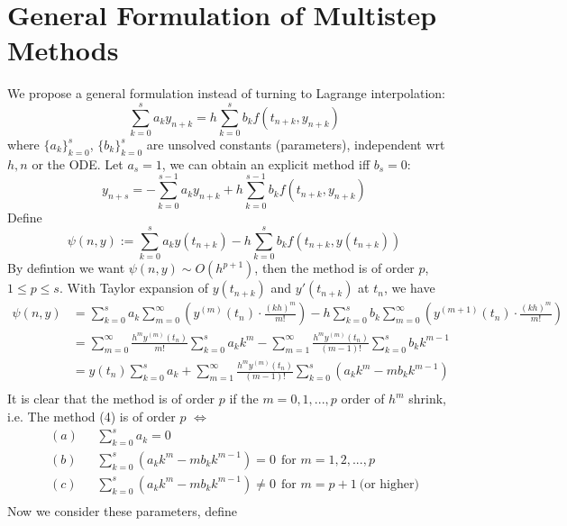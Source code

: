 \documentclass[a4paper, 11pt]{article}
\begin{document}
\section{General Formulation of Multistep Methods}
We propose a general formulation instead of turning to Lagrange interpolation:
\begin{equation}
	\sum_{k=0}^s a_k y_{n+k} = h\sum_{k=0}^s b_k f(t_{n+k}, y_{n+k})
\end{equation}
where $\{a_k\}_{k=0}^s$, $\{b_k\}_{k=0}^s$ are unsolved constants (parameters), independent wrt $h, n$ or the ODE. Let $a_s=1$, we can obtain an explicit method iff $b_s=0$:
$$
y_{n+s} = -\sum_{k=0}^{s-1} a_k y_{n+k} + h\sum_{k=0}^{s-1} b_k f(t_{n+k}, y_{n+k})
$$
Define
\begin{equation}
	\psi(n,y):= \sum_{k=0}^s a_k y(t_{n+k}) - h\sum_{k=0}^s b_k f(t_{n+k}, y(t_{n+k}))
\end{equation}
By defintion we want $\psi(n,y)\sim O(h^{p+1})$, then the method is of order $p$, $1\leq p\leq s$. With Taylor expansion of $y(t_{n+k})$ and $y'(t_{n+k})$ at $t_n$, we have
\begin{equation}
	\begin{split}
		\psi(n,y) &= \sum_{k=0}^s a_k \sum_{m=0}^{\infty}\left(y^{(m)}(t_{n})\cdot\frac{(kh)^m}{m!}\right) - h\sum_{k=0}^s b_k \sum_{m=0}^{\infty}\left(y^{(m+1)}(t_{n})\cdot\frac{(kh)^m}{m!}\right) \\
		&= \sum_{m=0}^{\infty}\frac{h^m y^{(m)}(t_n)}{m!} \sum_{k=0}^s a_k k^{m} - \sum_{m=1}^{\infty}\frac{h^m y^{(m)}(t_n)}{(m-1)!} \sum_{k=0}^s b_k k^{m-1}\\
		&= y(t_n)\sum_{k=0}^{s}a_k + \sum_{m=1}^{\infty}\frac{h^m y^{(m)}(t_n)}{(m-1)!}\sum_{k=0}^s (a_k k^m - mb_k k^{m-1})\\
	\end{split}
\end{equation}
It is clear that the method is of order $p$ if the $m=0, 1, ..., p$ order of $h^m$ shrink, i.e. The method (4) is of order $p$ $\iff$
\begin{equation}
	\begin{split}
		(a)~~~& \sum_{k=0}^s a_k =0\\
		(b)~~~& \sum_{k=0}^s (a_k k^m - mb_k k^{m-1}) =0~~\text{for } m=1,2,...,p\\
		(c)~~~& \sum_{k=0}^s (a_k k^m - mb_k k^{m-1}) \ne 0~~\text{for } m=p+1~\text{(or higher)}\\
	\end{split}
\end{equation}
Now we consider these parameters, define
\end{document}
